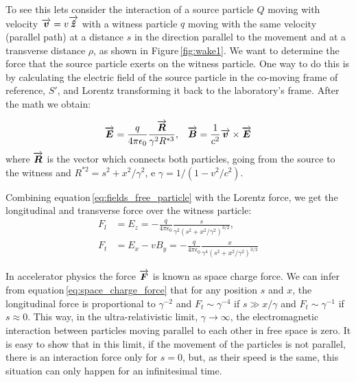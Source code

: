 To see this lets consider the interaction of a source particle $Q$ moving with velocity $\overrightarrow{\boldsymbol{v}}=v{\overrightarrow{\boldsymbol{\hat{z}}}}$ with a witness particle $q$ moving with the same velocity (parallel path) at a distance $s$ in the direction parallel to the movement and at a transverse distance $\rho$, as shown in Figure\,\ref{fig:wake1}. We want to determine the force that the source particle exerts on the witness particle. One way to do this is by calculating the electric field of the source particle in the co-moving frame of reference, $S'$, and Lorentz transforming it back to the laboratory's frame. After the math we obtain:

\begin{align}
 \label{eq:fields_free_particle}
 \overrightarrow{\boldsymbol{E}} = \frac{q}{4\pi\epsilon_0}\frac{\overrightarrow{\boldsymbol{R}}}{\gamma^2 R^{*3}}, & & \overrightarrow{\boldsymbol{B}} = \frac{1}{c^2}\overrightarrow{\boldsymbol{v}} \times \overrightarrow{\boldsymbol{E}}
\end{align}
where $\overrightarrow{\boldsymbol{R}}$ is the vector which connects both particles, going from the source to the witness and  $R^{*2} = s^2 + x^2/\gamma^2$, e $\gamma = 1/(1-v^2/c^2)$.

Combining equation\,\ref{eq:fields_free_particle} with the Lorentz force, we get the longitudinal and transverse force over the witness particle:
\begin{align}\label{eq:space_charge_force}
 F_l &= E_z = -\frac{q}{4\pi\epsilon_0}\frac{s}{\gamma^2\left(s^2+x^2/\gamma^2\right)^{3/2}}, \\
 F_t &= E_x - vB_y = -\frac{q}{4\pi\epsilon_0}\frac{x}{\gamma^4\left(s^2+x^2/\gamma^2\right)^{3/2}}
\end{align}

In accelerator physics the force $\overrightarrow{\boldsymbol{F}}$ is known as space charge force. We can infer from equation\,\ref{eq:space_charge_force} that for any position $s$ and $x$, the longitudinal force is proportional to $\gamma^{-2}$ and $F_t \sim \gamma^{-4}$ if $s \gg x/\gamma$ and  $F_t \sim \gamma^{-1}$ if $s \approx 0$. This way, in the ultra-relativistic limit, $\gamma \to \infty$, the electromagnetic interaction between particles moving parallel to each other in free space is zero. It is easy to show that in this limit, if the movement of the particles is not parallel, there is an interaction force only for $s=0$, but, as their speed is the same, this situation can only happen for an infinitesimal time.


